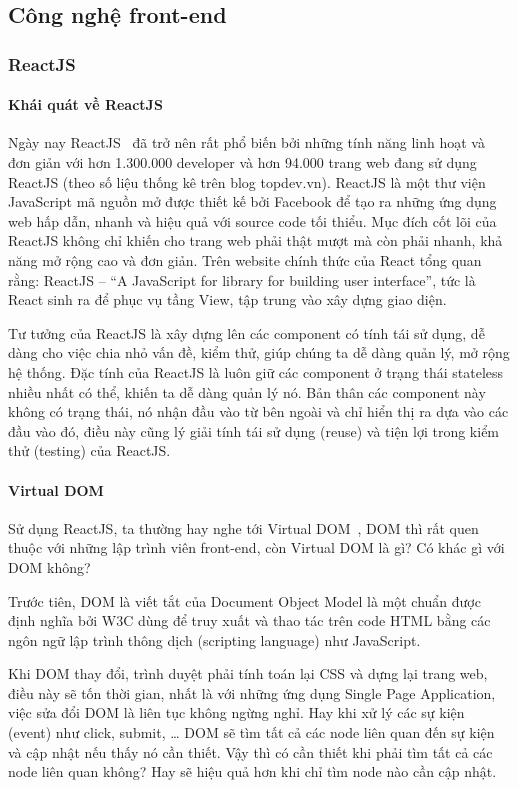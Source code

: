 \subsection{Công nghệ front-end}
\subsubsection{ReactJS}
\paragraph{Khái quát về ReactJS}
Ngày nay ReactJS~\cite{reactjs:online} đã trở nên rất phổ biến bởi những tính năng
linh hoạt và đơn giản với hơn 1.300.000 developer và hơn 94.000
trang web đang sử dụng ReactJS
(theo số liệu thống kê trên blog topdev.vn). 
ReactJS là một thư viện JavaScript mã nguồn mở được thiết kế
bởi Facebook để tạo ra những ứng dụng web hấp dẫn, nhanh và
hiệu quả với source code tối thiểu. Mục đích cốt lõi của
ReactJS không chỉ khiến cho trang web phải thật mượt mà còn
phải nhanh, khả năng mở rộng cao và đơn giản. Trên website chính
thức của React tổng quan rằng: ReactJS –
“A JavaScript for library for building user interface”,
tức là React sinh ra để phục vụ tầng View,
tập trung vào xây dựng giao diện. 

Tư tưởng của ReactJS là xây dựng lên các component có
tính tái sử dụng, dễ dàng cho việc chia nhỏ vấn đề, kiểm thử,
giúp chúng ta dễ dàng quản lý, mở rộng hệ thống. Đặc tính của
ReactJS là luôn giữ các component ở trạng thái stateless nhiều
nhất có thể, khiến ta dễ dàng quản lý nó. Bản thân các component
này không có trạng thái, nó nhận đầu vào từ bên ngoài và
chỉ hiển thị ra dựa vào các đầu vào đó, điều này
cũng lý giải tính tái sử dụng (reuse) và tiện lợi
trong kiểm thử (testing) của ReactJS.

\paragraph{Virtual DOM}
Sử dụng ReactJS, ta thường hay nghe tới Virtual DOM~\cite{virtualdom:online},
DOM thì rất quen thuộc với những lập trình viên front-end,
còn Virtual DOM là gì? Có khác gì với DOM không? 

Trước tiên, DOM là viết tắt của Document Object Model là
một chuẩn được định nghĩa bởi W3C dùng để truy xuất và thao
tác trên code HTML bằng các ngôn ngữ lập trình thông dịch
(scripting language) như JavaScript.

Khi DOM thay đổi, trình duyệt phải tính toán lại CSS và dựng lại
trang web, điều này sẽ tốn thời gian, nhất là với những ứng dụng
Single Page Application, việc sửa đổi DOM là liên tục không ngừng
nghỉ. Hay khi xử lý các sự kiện (event) như click, submit, …
DOM sẽ tìm tất cả các node liên quan đến sự kiện và cập nhật nếu
thấy nó cần thiết. Vậy thì có cần thiết khi phải tìm tất
cả các node liên quan không? Hay sẽ hiệu quả hơn khi chỉ tìm
node nào cần cập nhật.

